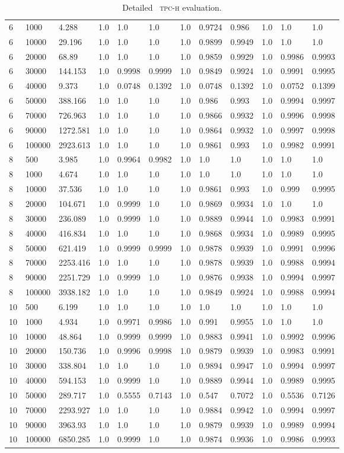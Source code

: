 \begin{table*}[!htbp]
\begin{tabular}{@{}llllllllllll@{}}
6&1000&4.288&1.0&1.0&1.0&1.0&0.9724&0.986&1.0&1.0&1.0 \\
6&10000&29.196&1.0&1.0&1.0&1.0&0.9899&0.9949&1.0&1.0&1.0 \\
6&20000&68.89&1.0&1.0&1.0&1.0&0.9859&0.9929&1.0&0.9986&0.9993 \\
6&30000&144.153&1.0&0.9998&0.9999&1.0&0.9849&0.9924&1.0&0.9991&0.9995 \\
6&40000&9.373&1.0&0.0748&0.1392&1.0&0.0748&0.1392&1.0&0.0752&0.1399 \\
6&50000&388.166&1.0&1.0&1.0&1.0&0.986&0.993&1.0&0.9994&0.9997 \\
6&70000&726.963&1.0&1.0&1.0&1.0&0.9866&0.9932&1.0&0.9996&0.9998 \\
6&90000&1272.581&1.0&1.0&1.0&1.0&0.9864&0.9932&1.0&0.9997&0.9998 \\
6&100000&2923.613&1.0&1.0&1.0&1.0&0.9861&0.993&1.0&0.9982&0.9991 \\
8&500&3.985&1.0&0.9964&0.9982&1.0&1.0&1.0&1.0&1.0&1.0 \\
8&1000&4.674&1.0&1.0&1.0&1.0&1.0&1.0&1.0&1.0&1.0 \\
8&10000&37.536&1.0&1.0&1.0&1.0&0.9861&0.993&1.0&0.999&0.9995 \\
8&20000&104.671&1.0&0.9999&1.0&1.0&0.9869&0.9934&1.0&1.0&1.0 \\
8&30000&236.089&1.0&0.9999&1.0&1.0&0.9889&0.9944&1.0&0.9983&0.9991 \\
8&40000&416.834&1.0&1.0&1.0&1.0&0.9868&0.9934&1.0&0.9989&0.9995 \\
8&50000&621.419&1.0&0.9999&0.9999&1.0&0.9878&0.9939&1.0&0.9991&0.9996 \\
8&70000&2253.416&1.0&1.0&1.0&1.0&0.9878&0.9939&1.0&0.9988&0.9994 \\
8&90000&2251.729&1.0&0.9999&1.0&1.0&0.9876&0.9938&1.0&0.9994&0.9997 \\
8&100000&3938.182&1.0&1.0&1.0&1.0&0.9849&0.9924&1.0&0.9988&0.9994 \\
10&500&6.199&1.0&1.0&1.0&1.0&1.0&1.0&1.0&1.0&1.0 \\
10&1000&4.934&1.0&0.9971&0.9986&1.0&0.991&0.9955&1.0&1.0&1.0 \\
10&10000&48.864&1.0&0.9999&0.9999&1.0&0.9883&0.9941&1.0&0.9992&0.9996 \\
10&20000&150.736&1.0&0.9996&0.9998&1.0&0.9879&0.9939&1.0&0.9983&0.9991 \\
10&30000&338.804&1.0&1.0&1.0&1.0&0.9894&0.9947&1.0&0.9994&0.9997 \\
10&40000&594.153&1.0&0.9999&1.0&1.0&0.9889&0.9944&1.0&0.9989&0.9995 \\
10&50000&289.717&1.0&0.5555&0.7143&1.0&0.547&0.7072&1.0&0.5536&0.7126 \\
10&70000&2293.927&1.0&1.0&1.0&1.0&0.9884&0.9942&1.0&0.9994&0.9997 \\
10&90000&3963.93&1.0&1.0&1.0&1.0&0.9879&0.9939&1.0&0.9989&0.9994 \\
10&100000&6850.285&1.0&0.9999&1.0&1.0&0.9874&0.9936&1.0&0.9986&0.9993  \\ \bottomrule
\end{tabular}
\caption{\label{tab:hospeval} Detailed ~\textsc{tpc-h} evaluation.}
\end{table*}

